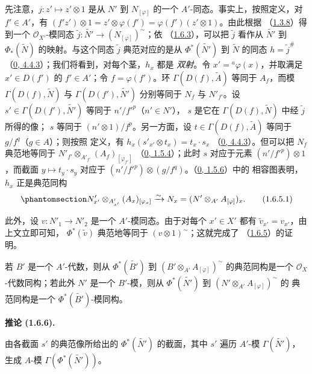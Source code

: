 \documentclass[UTF8,fontset=none,11pt,oneside,openany]{ctexbook}
\newenvironment{corollary}[1][]{%
  \par\medskip\noindent\textbf{推论 (#1).}\ %
}{\par}
\let\EGAOriginalLabel\label
\renewcommand{\label}[1]{\phantomsection\EGAOriginalLabel{#1}}
\begin{document}
先注意，$j:z'\mapsto z'\otimes 1$ 是从 $N'$ 到 $N_{[\varphi]}$ 的一个
$A'$-同态。事实上，按照定义，对 $f'\in A'$，有
$(f'z')\otimes 1=z'\otimes\varphi(f')=\varphi(f')(z'\otimes 1)$。由此根据
（\hyperref[I.1.3.8-fr]{1.3.8}）得到一个 $\mathscr{O}_{X'}$-模同态
$\widetilde{j}:\widetilde{N'}\to(N_{[\varphi]})^{\sim}$；依
（\hyperref[I.1.6.3-fr]{1.6.3}），可以把 $\widetilde{j}$ 看作从
$\widetilde{N'}$ 到 $\Phi_*(\widetilde{N})$ 的映射。与这个同态
$\widetilde{j}$ 典范对应的是从 $\Phi^*(\widetilde{N'})$ 到
$\widetilde{N}$ 的同态 $h=\widetilde{j}^{\#}$
（\hyperref[0.4.4.3-fr]{0, 4.4.3}）；我们将看到，对每个茎，$h_x$ 都是
\emph{双射}。令 $x'={}^a\varphi(x)$，并取满足 $x'\in D(f')$ 的
$f'\in A'$；令 $f=\varphi(f')$。环 $\Gamma(D(f),\widetilde{A})$
等同于 $A_f$，而模 $\Gamma(D(f),\widetilde{N})$ 与
$\Gamma(D(f'),\widetilde{N'})$ 分别等同于 $N_f$ 与 $N'_{f'}$。设
$s'\in\Gamma(D(f'),\widetilde{N'})$ 等同于 $n'/{f'}^p$（$n'\in N'$），
$s$ 是它在 $\Gamma(D(f),\widetilde{N})$ 中经 $\widetilde{j}$ 所得的像；
$s$ 等同于 $(n'\otimes 1)/f^p$。另一方面，设
$t\in\Gamma(D(f),\widetilde{A})$ 等同于 $g/f^q$（$g\in A$）；则按照
定义，有 $h_x(s'_{x'}\otimes t_x)=t_x\cdot s_x$
（\hyperref[0.4.4.3-fr]{0, 4.4.3}）。但可以把 $N_f$ 典范地等同于
$N'_{f'}\otimes_{A'_{f'}}(A_f)_{[\varphi_{f'}]}$
（\hyperref[0.1.5.4-fr]{0, 1.5.4}）；此时 $s$ 对应于元素
$(n'/{f'}^p)\otimes 1$，而截面 $y\mapsto t_y\cdot s_y$ 对应于
$(n'/{f'}^p)\otimes(g/f^q)$。（\hyperref[0.1.5.6-fr]{0, 1.5.6}）中的
相容图表明，$h_x$ 正是典范同构
\[
  \label{I.1.6.5.1-fr}
  N'_{x'}\otimes_{A'_{x'}}(A_x)_{[\varphi_x]}
  \xrightarrow{\sim}N_x=(N'\otimes_{A'}A_{[\varphi]})_x.
  \tag{1.6.5.1}
\]

此外，设 $v:N'_1\to N'_2$ 是一个 $A'$-模同态。由于对每个
$x'\in X'$ 都有 $\widetilde{v}_{x'}=v_{x'}$，由上文立即可知，
$\Phi^*(\widetilde{v})$ 典范地等同于 $(v\otimes 1)^{\sim}$；这就完成了
（\hyperref[I.1.6.5-fr]{1.6.5}）的证明。

若 $B'$ 是一个 $A'$-代数，则从 $\Phi^*(\widetilde{B'})$ 到
$(B'\otimes_{A'}A_{[\varphi]})^{\sim}$ 的典范同构是一个
$\mathscr{O}_X$-代数同构；若此外 $N'$ 是一个 $B'$-模，则从
$\Phi^*(\widetilde{N'})$ 到 $(N'\otimes_{A'}A_{[\varphi]})^{\sim}$ 的
典范同构是一个 $\Phi^*(\widetilde{B'})$-模同构。

\begin{corollary}[1.6.6]
\label{I.1.6.6-fr}
由各截面 $s'$ 的典范像所给出的 $\Phi^*(\widetilde{N'})$ 的截面，其中
$s'$ 遍历 $A'$-模 $\Gamma(\widetilde{N'})$，生成 $A$-模
$\Gamma(\Phi^*(\widetilde{N'}))$。
\end{corollary}
\end{document}
